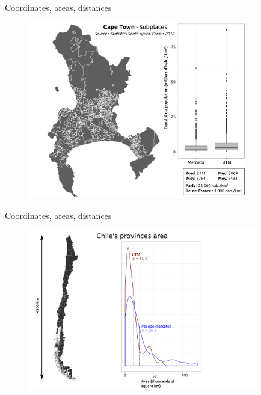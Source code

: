 \begin{frame}{Coordinates, areas, distances}

\begin{figure}
\includegraphics[width=9.5cm]{Projection.pdf}
\end{figure}

\end{frame}


\begin{frame}{Coordinates, areas, distances}

\begin{figure}
\includegraphics[width=10cm]{ChiliAire_EN.pdf}
\end{figure}

\end{frame}


